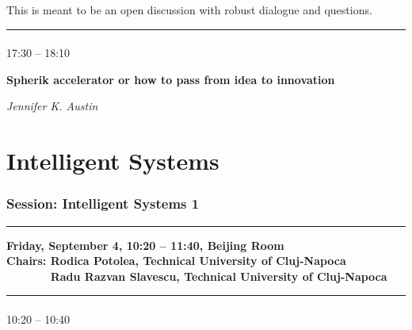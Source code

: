 This is meant to be an open discussion with robust dialogue and questions.


\noindent\rule{\textwidth}{0.4pt} \nopagebreak

\vspace*{-36pt}\subsection[ 
    	   {\bf Spherik accelerator or how to pass from idea to innovation
           } \\
           {\it Jennifer K. Austin
           }
	]
	    {
            }
	    17:30 -- 18:10 \nopagebreak

	    {\bf Spherik accelerator or how to pass from idea to innovation} \nopagebreak

	    {\it Jennifer K. Austin} \nopagebreak    
	    \\


\part{Intelligent Systems}

\section{{\bf \large Session: 
Intelligent Systems 1
}}\vspace{-15pt}


\noindent\rule{\textwidth}{0.4pt} \nopagebreak
{\bf  
Friday, September 4, 10:20 -- 11:40, Beijing Room
} \\ \nopagebreak
{\bf  Chairs: 
Rodica Potolea, Technical University of Cluj-Napoca
} \\ \nopagebreak
{\bf  \textcolor{white}{Chairs:} 
Radu Razvan Slavescu, Technical University of Cluj-Napoca
} %
\noindent\rule{\textwidth}{0.4pt} \nopagebreak

\vspace*{-36pt}
    \subsection[ 
    	   {\bf Association Rules Mining with Categories and Regular Expressions based Pruning
           } \\
           {\it Radu Razvan Razvan Slavescu, Raul Alexandru Persa, Kinga Cristina Slavescu, Tibor Wekerle
           }
	]
	    {
            }
	    {\small 10:20 -- 10:40} \nopagebreak
	    


